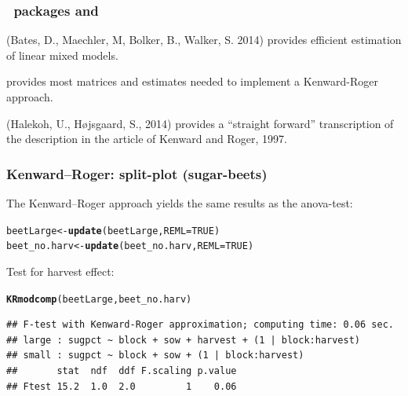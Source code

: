 \documentclass[compress]{beamer}\usepackage[]{graphicx}\usepackage[]{color}
\makeatletter
\newcommand{\hlnum}[1]{\textcolor[rgb]{0.686,0.059,0.569}{#1}}%
\newcommand{\hlstd}[1]{\textcolor[rgb]{0.345,0.345,0.345}{#1}}%
\newcommand{\hlkwb}[1]{\textcolor[rgb]{0.69,0.353,0.396}{#1}}%
\newcommand{\hlkwc}[1]{\textcolor[rgb]{0.333,0.667,0.333}{#1}}%
\newcommand{\hlkwd}[1]{\textcolor[rgb]{0.737,0.353,0.396}{\textbf{#1}}}%
\newenvironment{kframe}{%
 \def\at@end@of@kframe{}%
 \ifinner\ifhmode%
  \def\at@end@of@kframe{\end{minipage}}%
  \begin{minipage}{\columnwidth}%
 \fi\fi%
 \def\FrameCommand##1{\hskip\@totalleftmargin \hskip-\fboxsep
 \colorbox{shadecolor}{##1}\hskip-\fboxsep
     \hskip-\linewidth \hskip-\@totalleftmargin \hskip\columnwidth}%
 \MakeFramed {\advance\hsize-\width
   \@totalleftmargin\z@ \linewidth\hsize
   \@setminipage}}%
 {\par\unskip\endMakeFramed%
 \at@end@of@kframe}
\newenvironment{knitrout}{}{} %
\newenvironment{sframe}
{\begin{frame} [containsverbatim] }
  {\end{frame}}
\makeatother
\begin{document}
\begin{sframe}
  \frametitle{{\R\ packages } and }

   (Bates, D., Maechler, M,  Bolker, B., Walker, S. 2014)
provides efficient estimation of linear mixed models.

 provides most  matrices and estimates needed 
to  implement a Kenward-Roger approach.

 (Halekoh, U.,   H{\o}jsgaard, S., 2014)
provides a ``straight forward'' transcription of the
description in the article of Kenward and Roger,  1997.

\end{sframe}

 




\begin{sframe}
  \frametitle{Kenward--Roger: split-plot (sugar-beets)}
The Kenward--Roger approach yields the same results
as the anova-test:

\begin{knitrout}\tiny
{}\color{fgcolor}\begin{kframe}
\begin{alltt}
\hlstd{beetLarge} \hlkwb{<-} \hlkwd{update}\hlstd{(beetLarge,} \hlkwc{REML}\hlstd{=}\hlnum{TRUE}\hlstd{)}
\hlstd{beet_no.harv} \hlkwb{<-} \hlkwd{update}\hlstd{(beet_no.harv,} \hlkwc{REML}\hlstd{=}\hlnum{TRUE}\hlstd{)}
\end{alltt}
\end{kframe}
\end{knitrout}
Test for harvest effect:
\begin{knitrout}\tiny
{}\color{fgcolor}\begin{kframe}
\begin{alltt}
\hlkwd{KRmodcomp}\hlstd{(beetLarge, beet_no.harv)}
\end{alltt}
\begin{verbatim}
## F-test with Kenward-Roger approximation; computing time: 0.06 sec.
## large : sugpct ~ block + sow + harvest + (1 | block:harvest)
## small : sugpct ~ block + sow + (1 | block:harvest)
##       stat  ndf  ddf F.scaling p.value
## Ftest 15.2  1.0  2.0         1    0.06
\end{verbatim}
\end{kframe}
\end{knitrout}
\end{sframe}
\end{document}
